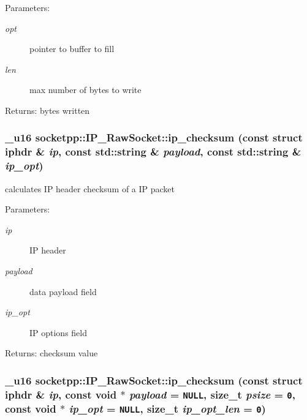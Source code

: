 \begin{Desc}
\item[Parameters:]
\begin{description}
\item[{\em opt}]pointer to buffer to fill \item[{\em len}]max number of bytes to write \end{description}
\end{Desc}
\begin{Desc}
\item[Returns:]bytes written \end{Desc}
\hypertarget{classsocketpp_1_1IP__RawSocket_6b48548362fb5509bbba7d36e9ffdb5d}{
\subsubsection[{ip\_\-checksum}]{\setlength{\rightskip}{0pt plus 5cm}\_\-u16 socketpp::IP\_\-RawSocket::ip\_\-checksum (const struct iphdr \& {\em ip}, \/  const std::string \& {\em payload}, \/  const std::string \& {\em ip\_\-opt})}}
\label{classsocketpp_1_1IP__RawSocket_6b48548362fb5509bbba7d36e9ffdb5d}


calculates IP header checksum of a IP packet 

\begin{Desc}
\item[Parameters:]
\begin{description}
\item[{\em ip}]IP header \item[{\em payload}]data payload field \item[{\em ip\_\-opt}]IP options field \end{description}
\end{Desc}
\begin{Desc}
\item[Returns:]checksum value \end{Desc}
\hypertarget{classsocketpp_1_1IP__RawSocket_91cc7b27ebb5eb8da6be6cdd14087f21}{
\subsubsection[{ip\_\-checksum}]{\setlength{\rightskip}{0pt plus 5cm}\_\-u16 socketpp::IP\_\-RawSocket::ip\_\-checksum (const struct iphdr \& {\em ip}, \/  const void $\ast$ {\em payload} = {\tt NULL}, \/  size\_\-t {\em psize} = {\tt 0}, \/  const void $\ast$ {\em ip\_\-opt} = {\tt NULL}, \/  size\_\-t {\em ip\_\-opt\_\-len} = {\tt 0})}}
\label{classsocketpp_1_1IP__RawSocket_91cc7b27ebb5eb8da6be6cdd14087f21}


